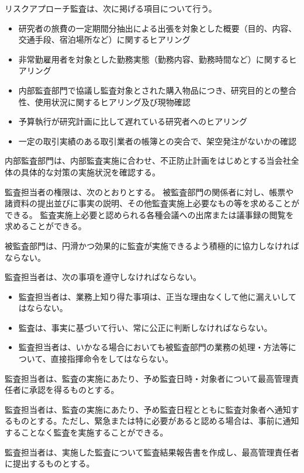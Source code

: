\documentclass[10pt,a4paper,uplatex]{jsarticle}
\begin{document}
リスクアプローチ監査は、次に掲げる項目について行う。
\begin{itemize}
	\item 研究者の旅費の一定期間分抽出による出張を対象とした概要（目的、内容、交通手段、宿泊場所など）に関するヒアリング
	\item 非常勤雇用者を対象とした勤務実態（勤務内容、勤務時間など）に関するヒアリング
	\item 内部監査部門で協議し監査対象とされた購入物品につき、研究目的との整合性、使用状況に関するヒアリング及び現物確認
	\item 予算執行が研究計画に比して遅れている研究者へのヒアリング
	\item 一定の取引実績のある取引業者の帳簿との突合で、架空発注がないかの確認
\end{itemize}

内部監査部門は、内部監査実施に合わせ、不正防止計画をはじめとする当会社全体の具体的な対策の実施状況を確認する。

監査担当者の権限は、次のとおりとする。
\term 被監査部門の関係者に対し、帳票や諸資料の提出並びに事実の説明、その他監査実施上必要なもの等を求めることができる。
\term 監査実施上必要と認められる各種会議への出席または議事録の閲覧を求めることができる。

被監査部門は、円滑かつ効果的に監査が実施できるよう積極的に協力しなければならない。

監査担当者は、次の事項を遵守しなければならない。
\begin{itemize}
	\item 監査担当者は、業務上知り得た事項は、正当な理由なくして他に漏えいしてはならない。
	\item 監査は、事実に基づいて行い、常に公正に判断しなければならない。
	\item 監査担当者は、いかなる場合においても被監査部門の業務の処理・方法等について、直接指揮命令をしてはならない。
\end{itemize}

監査担当者は、監査の実施にあたり、予め監査日時・対象者について最高管理責任者に承認を得るものとする。

監査担当者は、監査の実施にあたり、予め監査日程とともに監査対象者へ通知するものとする。ただし、緊急または特に必要があると認める場合は、事前に通知することなく監査を実施することができる。

監査担当者は、実施した監査について監査結果報告書を作成し、最高管理責任者に提出するものとする。
\end{document}
